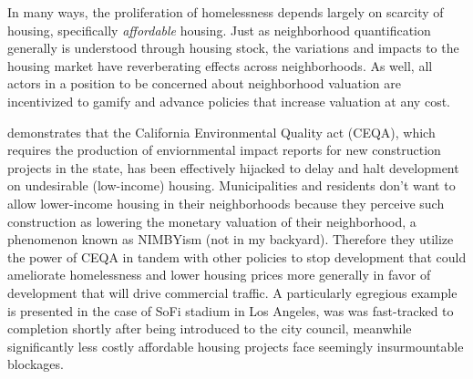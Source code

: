 In many ways, the proliferation of homelessness depends largely on
scarcity of housing, specifically \emph{affordable} housing. Just as
neighborhood quantification generally is understood through housing
stock, the variations and impacts to the housing market have
reverberating effects across neighborhoods. As well, all actors in a
position to be concerned about neighborhood valuation are incentivized
to gamify and advance policies that increase valuation at any cost.

\cite{dewitt2022TwistedFate} demonstrates that the California
Environmental Quality act (CEQA), which requires the production of
enviornmental impact reports for new construction projects in the
state, has been effectively hijacked to delay and halt development on
undesirable (low-income) housing. Municipalities and residents don't
want to allow lower-income housing in their neighborhoods because they
perceive such construction as lowering the monetary valuation of their
neighborhood, a phenomenon known as NIMBYism (not in my
backyard). Therefore they utilize the power of CEQA in tandem with
other policies to stop development that could ameliorate homelessness
and lower housing prices more generally in favor of development that
will drive commercial traffic. A particularly egregious example is
presented in the case of SoFi stadium in Los Angeles, was was
fast-tracked to completion shortly after being introduced to the city
council, meanwhile significantly less costly affordable housing
projects face seemingly insurmountable blockages.

